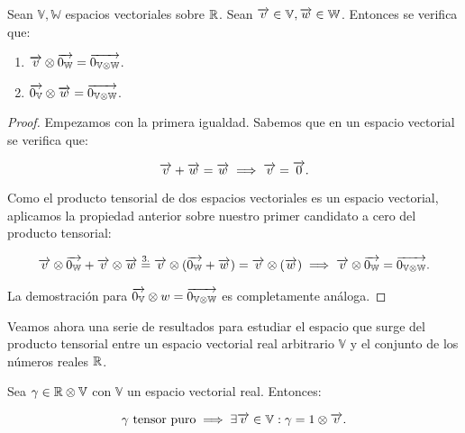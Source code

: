 \begin{proposicion}
	Sean $\mathbb{V}, \mathbb{W}$ espacios vectoriales sobre $\mathbb{R}$. Sean $\overrightarrow{v} \in \mathbb{V}, \overrightarrow{w} \in \mathbb{W}$. Entonces se verifica que:

	\begin{enumerate}
		\item $\overrightarrow{v} \otimes \overrightarrow{0_\mathbb{W}} = \overrightarrow{0_{\mathbb{V} \otimes \mathbb{W}}}$.
		\item $\overrightarrow{0_{\mathbb{V}}} \otimes \overrightarrow{w} = \overrightarrow{0_{\mathbb{V} \otimes \mathbb{W}}}$.
	\end{enumerate}
\end{proposicion}
\begin{proof}
	Empezamos con la primera igualdad. Sabemos que en un espacio vectorial se verifica que:

	\begin{equation} \label{eq:dem_tensor_cero}
		\overrightarrow{v} + \overrightarrow{w} = \overrightarrow{w} \implies \overrightarrow{v} = \overrightarrow{0}.
	\end{equation}

    Como el producto tensorial de dos espacios vectoriales es un espacio vectorial, aplicamos la propiedad anterior sobre nuestro primer candidato a cero del producto tensorial:

	\begin{equation}
		\begin{split}
			\overrightarrow{v} \otimes \overrightarrow{0_\mathbb{W}} + \overrightarrow{v} \otimes \overrightarrow{w} \stackrel{\text{3.}}{=} \overrightarrow{v} \otimes (\overrightarrow{0_\mathbb{W}} + \overrightarrow{w}) = \overrightarrow{v} \otimes (\overrightarrow{w}) \implies \overrightarrow{v} \otimes \overrightarrow{0_\mathbb{W}} = \overrightarrow{0_{\mathbb{V} \otimes \mathbb{W}}}.
		\end{split}
	\end{equation}

	La demostración para $\overrightarrow{0_{\mathbb{V}}} \otimes w = \overrightarrow{0_{\mathbb{V} \otimes \mathbb{W}}}$ es completamente análoga.
\end{proof}

Veamos ahora una serie de resultados para estudiar el espacio que surge del producto tensorial entre un espacio vectorial real arbitrario $\mathbb{V}$ y el conjunto de los números reales $\mathbb{R}$.

\begin{proposicion}
	Sea $\gamma \in \mathbb{R} \otimes \mathbb{V}$ con $\mathbb{V}$ un espacio vectorial real. Entonces:

	\begin{equation}
		\gamma \text{ tensor puro} \implies \exists \overrightarrow{v} \in \mathbb{V}: \gamma = 1 \otimes \overrightarrow{v}.
	\end{equation}
\end{proposicion}

